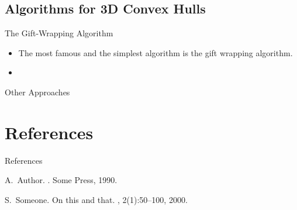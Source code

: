 \documentclass{beamer}
\begin{document}
\subsection*{Algorithms for 3D Convex Hulls}
\begin{frame}{The Gift-Wrapping Algorithm}
    \begin{itemize}
        \item The most famous and the simplest algorithm is the 
        gift wrapping algorithm. 
        \item 
    \end{itemize} 
\end{frame}

\begin{frame}{Other Approaches}
    
\end{frame}

\section*{References}
\begin{frame}{References}
          \begin{thebibliography}{10}
          
             \beamertemplatebookbibitems
          
               A.~Author.
               .
    \newblock Some Press, 1990.

  \beamertemplatearticlebibitems
  
    S.~Someone.
    \newblock On this and that.
    , 2(1):50--100,
    2000.
  \end{thebibliography}
\end{frame}
\end{document}
